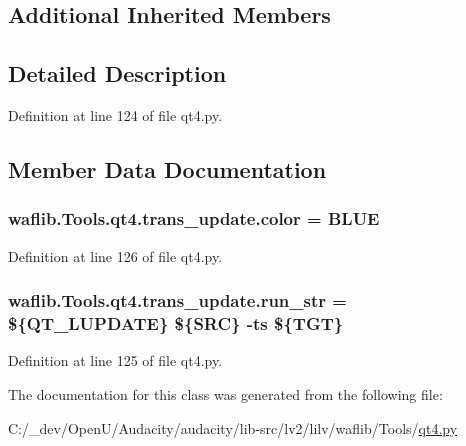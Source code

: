 \subsection*{Additional Inherited Members}


\subsection{Detailed Description}


Definition at line 124 of file qt4.\+py.



\subsection{Member Data Documentation}
\subsubsection[{\texorpdfstring{color}{color}}]{ waflib.\+Tools.\+qt4.\+trans\+\_\+update.\+color = \textquotesingle{}B\+L\+UE\textquotesingle{}\hspace{0.3cm}{\ttfamily [static]}}\hypertarget{classwaflib_1_1_tools_1_1qt4_1_1trans__update_ada6a7abbee06be6064c541aab1a77b0d}{}\label{classwaflib_1_1_tools_1_1qt4_1_1trans__update_ada6a7abbee06be6064c541aab1a77b0d}


Definition at line 126 of file qt4.\+py.

\subsubsection[{\texorpdfstring{run\+\_\+str}{run_str}}]{ waflib.\+Tools.\+qt4.\+trans\+\_\+update.\+run\+\_\+str = \textquotesingle{}\$\{Q\+T\+\_\+\+L\+U\+P\+D\+A\+TE\} \$\{S\+RC\} -\/ts \$\{T\+GT\}\textquotesingle{}\hspace{0.3cm}{\ttfamily [static]}}\hypertarget{classwaflib_1_1_tools_1_1qt4_1_1trans__update_af42e2219930192472fa19b54ccc678ce}{}\label{classwaflib_1_1_tools_1_1qt4_1_1trans__update_af42e2219930192472fa19b54ccc678ce}


Definition at line 125 of file qt4.\+py.



The documentation for this class was generated from the following file\+:\begin{DoxyCompactItemize}
\item 
C\+:/\+\_\+dev/\+Open\+U/\+Audacity/audacity/lib-\/src/lv2/lilv/waflib/\+Tools/\hyperlink{lilv_2waflib_2_tools_2qt4_8py}{qt4.\+py}\end{DoxyCompactItemize}
